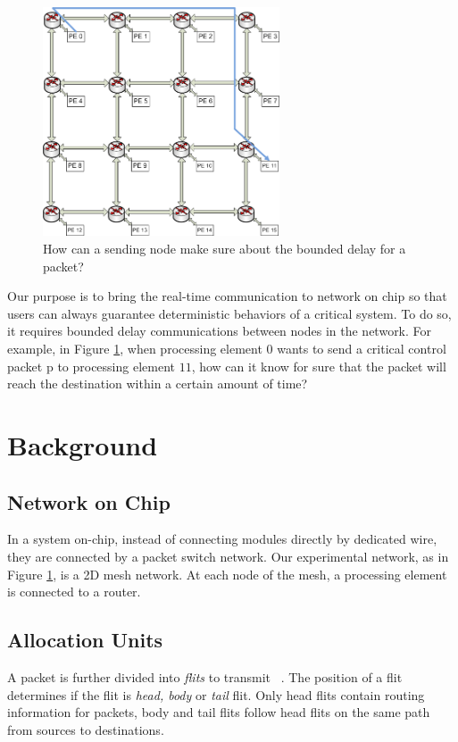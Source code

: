 \documentclass[conference, twocolumn]{IEEEtran}
\theoremstyle{definition}
\begin{document}
\begin{figure}[htp]
\centering
\includegraphics[width=7cm]{pics/NoC0}
\caption[Demand for a hard real-time flow.]
{How can a sending node make sure about the bounded delay for
a packet?}\label{fig:NoCRt}
\end{figure}

Our purpose is to bring the real-time communication to network on chip so that 
users can always guarantee deterministic behaviors of a critical system. To do 
so, it requires bounded delay communications between nodes in the network. 
For example, in Figure \ref{fig:NoCRt}, when processing element $0$ wants
to send a critical control packet p to processing element $11$, how can it know
for sure that the packet will reach the destination within a certain amount of time? 


\section{Background}
\subsection{Network on Chip}
In a system on-chip, instead of connecting modules directly by dedicated wire,
they are connected by a packet switch network. Our experimental network, as
in Figure \ref{fig:NoCRt}, is a 2D mesh network. At each node of the mesh, a
processing element is connected to a router.

\subsection{Allocation Units}
A packet is further divided into {\em flits} to transmit
~\cite{DallyPrinNetwork}. The position of a flit determines if the flit is {\em
head, body} or {\em tail} flit. Only head flits contain routing information for
packets, body and tail flits follow head flits on the same path from sources to
destinations.
\end{document}
